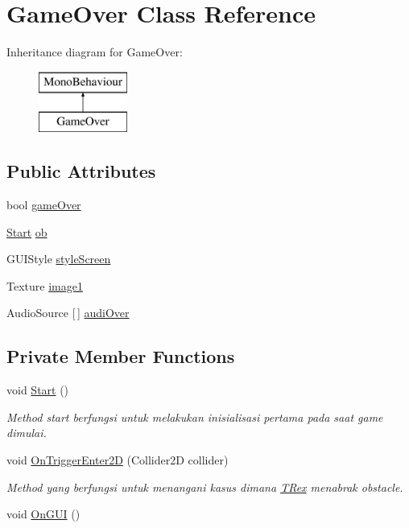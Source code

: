 \hypertarget{class_game_over}{}\section{Game\+Over Class Reference}
\label{class_game_over}
Inheritance diagram for Game\+Over\+:\begin{figure}[H]
\begin{center}
\leavevmode
\includegraphics[height=2.000000cm]{class_game_over}
\end{center}
\end{figure}
\subsection*{Public Attributes}
\begin{DoxyCompactItemize}
\item 
bool \hyperlink{class_game_over_a017e52022fa05909ffff9f41cf66556f}{game\+Over}
\item 
\hyperlink{class_start}{Start} \hyperlink{class_game_over_a02e1491bad9373330f05c667aa6eca9d}{ob}
\item 
G\+U\+I\+Style \hyperlink{class_game_over_a038383b18f14cf294618f4f66f919a1d}{style\+Screen}
\item 
Texture \hyperlink{class_game_over_a3d0b130d2f0adc32fad8c776512c4d81}{image1}
\item 
Audio\+Source \mbox{[}$\,$\mbox{]} \hyperlink{class_game_over_a7fc748e99982365f5d3aa91ee48fcaae}{audi\+Over}
\end{DoxyCompactItemize}
\subsection*{Private Member Functions}
\begin{DoxyCompactItemize}
\item 
void \hyperlink{class_game_over_a568be230765aad02fc07c3ff2d655e41}{Start} ()
\begin{DoxyCompactList}\small\item\em Method start berfungsi untuk melakukan inisialisasi pertama pada saat game dimulai. \end{DoxyCompactList}\item 
void \hyperlink{class_game_over_a8da95bbe7fc4559116c077698378bbfb}{On\+Trigger\+Enter2D} (Collider2D collider)
\begin{DoxyCompactList}\small\item\em Method yang berfungsi untuk menangani kasus dimana \hyperlink{class_t_rex}{T\+Rex} menabrak obstacle. \end{DoxyCompactList}\item 
void \hyperlink{class_game_over_abc4992fdbb9d7c3c8134ff24d1944171}{On\+G\+UI} ()
\end{DoxyCompactItemize}


